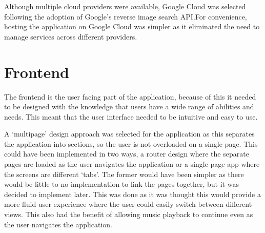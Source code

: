 Although multiple cloud providers were available, Google Cloud was selected following the adoption of Google's reverse image search API.\@ For convenience, hosting the application on Google Cloud was simpler as it eliminated the need to manage services across different providers.

\section{Frontend}
The frontend is the user facing part of the application, because of this it needed to be designed with the knowledge that users have a wide range of abilities and needs. This meant that the user interface needed to be intuitive and easy to use.

A `multipage' design approach was selected for the application as this separates the application into sections, so the user is not overloaded on a single page. This could have been implemented in two ways, a router design where the separate pages are loaded as the user navigates the application or a single page app where the screens are different `tabs'. The former would have been simpler as there would be little to no implementation to link the pages together, but it was decided to implement later. This was done as it was thought this would provide a more fluid user experience where the user could easily switch between different views. This also had the benefit of allowing music playback to continue even as the user navigates the application.

